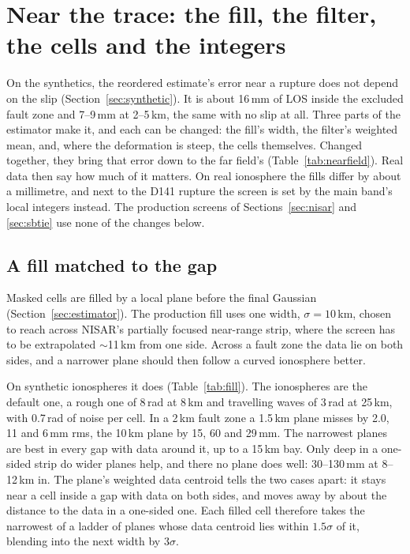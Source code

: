 \section{Near the trace: the fill, the filter, the cells and the integers}
\label{sec:nearfield}

On the synthetics, the reordered estimate's error near a rupture does not depend on the slip
(Section~\ref{sec:synthetic}). It is about 16\,mm of LOS inside the excluded fault zone and 7--9\,mm at 2--5\,km, the
same with no slip at all. Three parts of the estimator make it, and each can be changed: the fill's width, the filter's
weighted mean, and, where the deformation is steep, the cells themselves. Changed together, they bring that error
down to the far field's (Table~\ref{tab:nearfield}). Real data then say how much of it matters. On real ionosphere the
fills differ by about a millimetre, and next to the D141 rupture the screen is set by the main band's local integers
instead. The production screens of Sections~\ref{sec:nisar} and \ref{sec:sbtie} use none of the changes below.

\subsection{A fill matched to the gap}
\label{sec:fill}
Masked cells are filled by a local plane before the final Gaussian (Section~\ref{sec:estimator}). The production fill
uses one width, $\sigma = 10$\,km, chosen to reach across NISAR's partially focused near-range strip, where the screen
has to be extrapolated $\sim$11\,km from one side. Across a fault zone the data lie on both sides, and a narrower plane
should then follow a curved ionosphere better.

On synthetic ionospheres it does (Table~\ref{tab:fill}). The ionospheres are the default one, a rough one of 8\,rad at
8\,km and travelling waves of 3\,rad at 25\,km, with 0.7\,rad of noise per cell. In a 2\,km fault zone a 1.5\,km plane
misses by 2.0, 11 and 6\,mm rms, the 10\,km plane by 15, 60 and 29\,mm. The narrowest planes are best in every gap with
data around it, up to a 15\,km bay. Only deep in a one-sided strip do wider planes help, and there no plane does well:
30--130\,mm at 8--12\,km in. The plane's weighted data centroid tells the two cases apart: it stays near a cell inside
a gap with data on both sides, and moves away by about the distance to the data in a one-sided one. Each filled cell
therefore takes the narrowest of a ladder of planes whose data centroid lies within $1.5\sigma$ of it, blending into
the next width by $3\sigma$.

